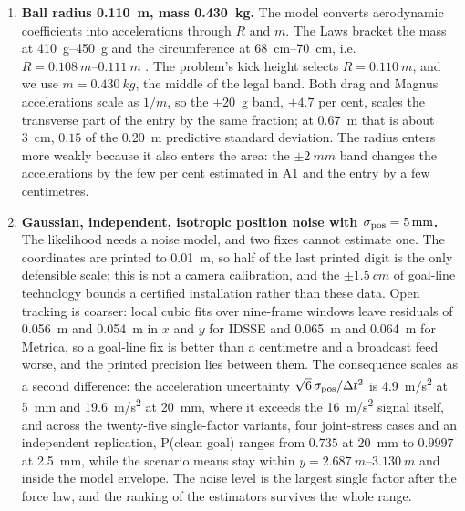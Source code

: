 \begin{enumerate}[label=\textbf{A\arabic*},leftmargin=*,itemsep=6pt]
\item \textbf{Ball radius \SI{0.110}{m}, mass \SI{0.430}{kg}.}
The model converts aerodynamic coefficients into accelerations through $R$ and
$m$. The Laws bracket the mass at \SIrange{410}{450}{g} and the circumference
at \SIrange{68}{70}{cm}, i.e.\ $R=\SIrange{0.108}{0.111}{m}$
\citep{ifab2025}. The problem's kick height selects $R=\SI{0.110}{m}$, and we
use $m=\SI{0.430}{kg}$, the middle of the legal band. Both drag and Magnus
accelerations scale as $1/m$, so the $\pm20$~g band, $\pm4.7$ per cent, scales
the transverse part of the entry by the same fraction; at \SI{0.67}{m} that
is about \SI{3}{cm}, $0.15$ of the \SI{0.20}{m} predictive standard deviation.
The radius enters more weakly because it also enters the area: the
$\pm\SI{2}{mm}$ band changes the accelerations by the few per cent estimated
in A1 and the entry by a few centimetres.

\item \textbf{Gaussian, independent, isotropic position noise with
$\sigma_{\rm pos}=\SI{5}{mm}$.}
The likelihood needs a noise model, and two fixes cannot estimate one. The
coordinates are printed to \SI{0.01}{m}, so half of the last printed digit is
the only defensible scale; this is not a camera calibration, and the
$\pm\SI{1.5}{cm}$ of goal-line technology \citep{fifa2020glt} bounds a
certified installation rather than these data. Open tracking is coarser: local
cubic fits over nine-frame windows leave residuals of \SI{0.056}{m} and
\SI{0.054}{m} in $x$ and $y$ for IDSSE and \SI{0.065}{m} and
\SI{0.064}{m} for Metrica, so a goal-line fix is better than a centimetre and
a broadcast feed worse, and the printed precision lies between them. The
consequence scales as a second difference: the acceleration uncertainty
$\sqrt6\,\sigma_{\rm pos}/\Delta t^2$ is \SI{4.9}{m/s^2} at \SI{5}{mm} and
\SI{19.6}{m/s^2} at \SI{20}{mm}, where it exceeds the \SI{16}{m/s^2} signal
itself, and across the twenty-five single-factor variants, four joint-stress cases and
an independent replication, P(clean goal) ranges from $0.735$ at \SI{20}{mm} to
$0.9997$ at \SI{2.5}{mm}, while the scenario means stay within
$y=\SIrange{2.687}{3.130}{m}$ and inside the model envelope. The noise level
is the largest single factor after the force law, and the ranking of the
estimators survives the whole range.


\end{enumerate}
